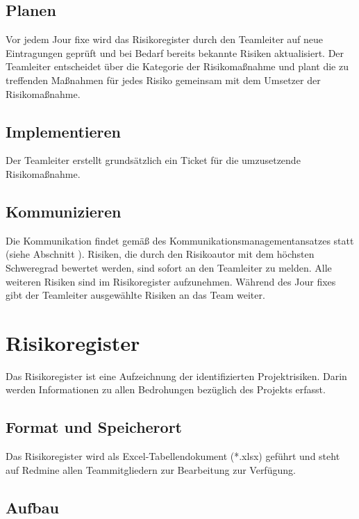 \documentclass[a4paper,11pt,listof=numbered,glossary=totoc,parskip=half,toc=bib]{scrreprt}
\begin{document}
\subsection{Planen}

Vor jedem Jour fixe wird das Risikoregister durch den Teamleiter auf neue Eintragungen geprüft und bei Bedarf bereits bekannte Risiken aktualisiert. Der Teamleiter entscheidet über die Kategorie der Risikomaßnahme und plant die zu treffenden Maßnahmen für jedes Risiko gemeinsam mit dem Umsetzer der Risikomaßnahme.

\subsection{Implementieren}

Der Teamleiter erstellt grundsätzlich ein Ticket für die umzusetzende Risikomaßnahme.

\subsection{Kommunizieren}

Die Kommunikation findet gemäß des Kommunikationsmanagementansatzes statt (siehe Abschnitt ). Risiken, die durch den Risikoautor mit dem höchsten Schweregrad bewertet werden, sind sofort an den Teamleiter zu melden. Alle weiteren Risiken sind im Risikoregister aufzunehmen. Während des Jour fixes gibt der Teamleiter ausgewählte Risiken an das Team weiter.

\section{Risikoregister}
\label{subsec:risikoregister}

Das Risikoregister ist eine Aufzeichnung der identifizierten Projektrisiken. Darin werden Informationen zu allen Bedrohungen bezüglich des Projekts erfasst.

\subsection{Format und Speicherort}

Das Risikoregister wird als Excel-Tabellendokument (*.xlsx) geführt und steht auf Redmine allen Teammitgliedern zur Bearbeitung zur Verfügung.

\subsection{Aufbau}
\end{document}
